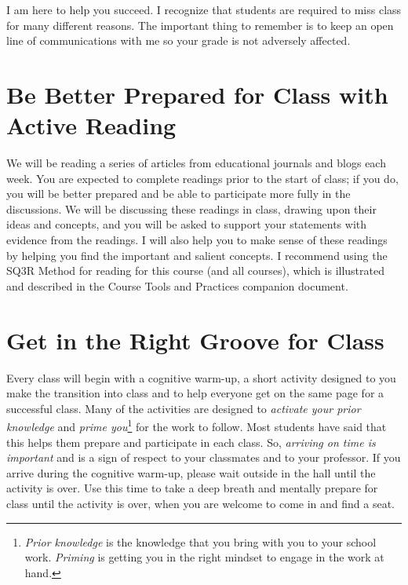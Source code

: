 \documentclass{tufte-handout}
\begin{document}
 I am here to help you succeed. I recognize that students are required to miss class for many different reasons. The important thing to remember is to keep an open line of communications with me so your grade is not adversely affected.

\section{Be Better Prepared for Class with Active Reading}
We will be reading a series of articles from educational journals and blogs each week. You are expected to complete readings prior to the start of class; if you do, you will be better prepared and be able to participate more fully in the discussions. We will be discussing these readings in class, drawing upon their ideas and concepts, and you will be asked to support your statements with evidence from the readings. I will also help you to make sense of these readings by helping you find the important and salient concepts. I recommend using the \textsf{SQ3R Method} for reading for this course (and all courses), which is illustrated and described in the \textsf{Course Tools and Practices} companion document.

\section{Get in the Right Groove for Class}
Every class will begin with a \textsf{cognitive warm-up}, a short activity designed to you make the transition into class and to help everyone get on the same page for a successful class. Many of the activities are designed to \textit{activate your prior knowledge} and \textit{prime you}\footnote{\textit{Prior knowledge} is the knowledge that you bring with you to your school work. \textit{Priming} is getting you in the right mindset to engage in the work at hand.} for the work to follow. Most students have said that this helps them prepare and participate in each class. So, \textit{arriving on time is important} and is a sign of respect to your classmates and to your professor. If you arrive during the cognitive warm-up, please wait outside in the hall until the activity is over. Use this time to take a deep breath and mentally prepare for class until the activity is over, when you are welcome to come in and find a seat.
\end{document}
